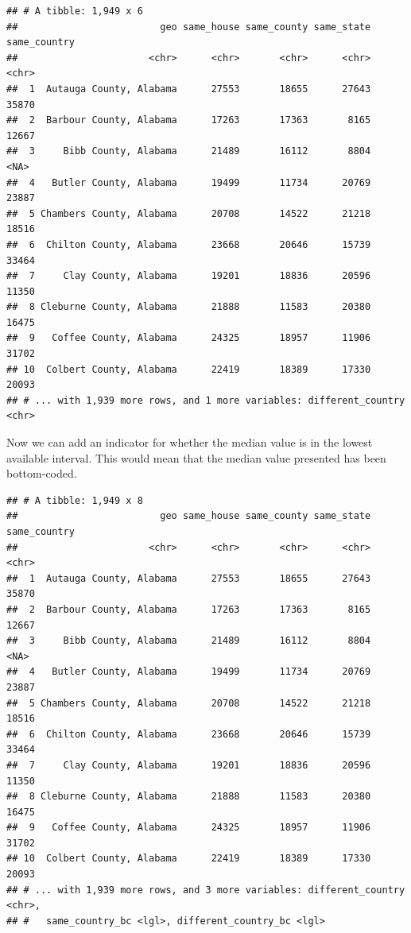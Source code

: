 \documentclass[]{book}
\newenvironment{Shaded}{\begin{snugshade}}{\end{snugshade}}
\newcommand{\KeywordTok}[1]{\textcolor[rgb]{0.13,0.29,0.53}{\textbf{{#1}}}}
\newcommand{\DataTypeTok}[1]{\textcolor[rgb]{0.13,0.29,0.53}{{#1}}}
\newcommand{\StringTok}[1]{\textcolor[rgb]{0.31,0.60,0.02}{{#1}}}
\newcommand{\NormalTok}[1]{{#1}}
\theoremstyle{definition}
\theoremstyle{definition}
\theoremstyle{remark}
\begin{document}
\begin{verbatim}
## # A tibble: 1,949 x 6
##                         geo same_house same_county same_state same_country
##                       <chr>      <chr>       <chr>      <chr>        <chr>
##  1  Autauga County, Alabama      27553       18655      27643        35870
##  2  Barbour County, Alabama      17263       17363       8165        12667
##  3     Bibb County, Alabama      21489       16112       8804         <NA>
##  4   Butler County, Alabama      19499       11734      20769        23887
##  5 Chambers County, Alabama      20708       14522      21218        18516
##  6  Chilton County, Alabama      23668       20646      15739        33464
##  7     Clay County, Alabama      19201       18836      20596        11350
##  8 Cleburne County, Alabama      21888       11583      20380        16475
##  9   Coffee County, Alabama      24325       18957      11906        31702
## 10  Colbert County, Alabama      22419       18389      17330        20093
## # ... with 1,939 more rows, and 1 more variables: different_country <chr>
\end{verbatim}

Now we can add an indicator for whether the median value is in the
lowest available interval. This would mean that the median value
presented has been bottom-coded.

\begin{Shaded}
\end{Shaded}

\begin{verbatim}
## # A tibble: 1,949 x 8
##                         geo same_house same_county same_state same_country
##                       <chr>      <chr>       <chr>      <chr>        <chr>
##  1  Autauga County, Alabama      27553       18655      27643        35870
##  2  Barbour County, Alabama      17263       17363       8165        12667
##  3     Bibb County, Alabama      21489       16112       8804         <NA>
##  4   Butler County, Alabama      19499       11734      20769        23887
##  5 Chambers County, Alabama      20708       14522      21218        18516
##  6  Chilton County, Alabama      23668       20646      15739        33464
##  7     Clay County, Alabama      19201       18836      20596        11350
##  8 Cleburne County, Alabama      21888       11583      20380        16475
##  9   Coffee County, Alabama      24325       18957      11906        31702
## 10  Colbert County, Alabama      22419       18389      17330        20093
## # ... with 1,939 more rows, and 3 more variables: different_country <chr>,
## #   same_country_bc <lgl>, different_country_bc <lgl>
\end{verbatim}
\end{document}
